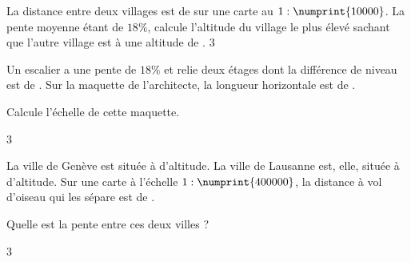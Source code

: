 \documentclass[a4paper,11pt]{report}
\begin{document}
\begin{exo}{
La distance entre deux villages est de  sur une carte au $1:\numprint{10000}$. La pente moyenne étant de $18\%$, calcule l'altitude du village le plus élevé sachant que l'autre village est à une altitude de .
}{3}
\end{exo}


\begin{exo}{
Un escalier a une pente de $18\%$ et relie deux étages dont la différence de niveau est de . Sur la maquette de l'architecte, la longueur horizontale est de . 

Calcule l'échelle de cette maquette.
}{3}
\end{exo}



\begin{exo}{
La ville de Genève est située à  d'altitude. La ville de Lausanne est, elle, située à  d'altitude.
Sur une carte à l'échelle $1:\numprint{400000}$, la distance à vol d'oiseau qui les sépare est de .

Quelle est la pente entre ces deux villes ?

}{3}
\end{exo}
\end{document}
